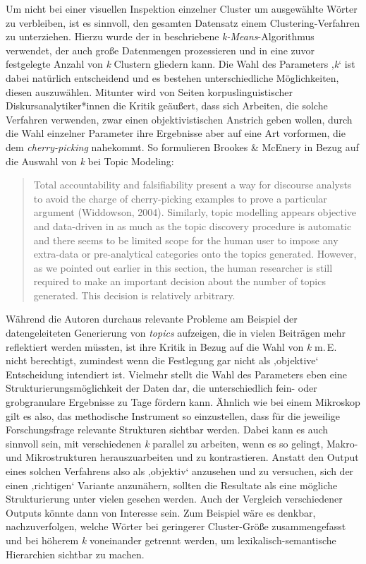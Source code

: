 Um nicht bei einer visuellen Inspektion einzelner Cluster um ausgewählte Wörter zu verbleiben, ist es sinnvoll, den gesamten Datensatz einem Clustering-Verfahren zu unterziehen. Hierzu wurde der in  beschriebene \emph{k-Means}-Algorithmus verwendet, der auch große Datenmengen prozessieren und in eine zuvor festgelegte Anzahl von \emph{k} Clustern gliedern kann. Die Wahl des Parameters ‚\emph{k}` ist dabei natürlich entscheidend und es bestehen unterschiedliche Möglichkeiten, diesen auszuwählen. Mitunter wird von Seiten korpuslinguistischer Diskursanalytiker*innen die Kritik geäußert, dass sich Arbeiten, die solche Verfahren verwenden, zwar einen objektivistischen Anstrich geben wollen, durch die Wahl einzelner Parameter ihre Ergebnisse aber auf eine Art vorformen, die dem \emph{cherry-picking} nahekommt. So formulieren Brookes \& McEnery in Bezug auf die Auswahl von \emph{k} bei Topic Modeling:

\begin{quote}
Total accountability and falsifiability present a way for discourse analysts to avoid the charge of cherry-picking examples to prove a particular argument (Widdowson, 2004). Similarly, topic modelling appears objective and data-driven in as much as the topic discovery procedure is automatic and there seems to be limited scope for the human user to impose any extra-data or pre-analytical categories onto the topics generated. However, as we pointed out earlier in this section, the human researcher is still required to make an important decision about the number of topics generated. This decision is relatively arbitrary. \autocite[7]{brookesUtilityTopicModelling2019}
\end{quote}

Während die Autoren durchaus relevante Probleme am Beispiel der datengeleiteten Generierung von \emph{topics} aufzeigen, die in vielen Beiträgen mehr reflektiert werden müssten, ist ihre Kritik in Bezug auf die Wahl von \emph{k} m.\,E. nicht berechtigt, zumindest wenn die Festlegung gar nicht als ‚objektive` Entscheidung intendiert ist. Vielmehr stellt die Wahl des Parameters eben eine Strukturierungsmöglichkeit der Daten dar, die unterschiedlich fein- oder grobgranulare Ergebnisse zu Tage fördern kann. Ähnlich wie bei einem Mikroskop gilt es also, das methodische Instrument so einzustellen, dass für die jeweilige Forschungsfrage relevante Strukturen sichtbar werden. Dabei kann es auch sinnvoll sein, mit verschiedenen \emph{k} parallel zu arbeiten, wenn es so gelingt, Makro- und Mikrostrukturen herauszuarbeiten und zu kontrastieren. Anstatt den Output eines solchen Verfahrens also als ‚objektiv` anzusehen und zu versuchen, sich der einen ‚richtigen` Variante anzunähern, sollten die Resultate als eine mögliche Strukturierung unter vielen gesehen werden. Auch der Vergleich verschiedener Outputs könnte dann von Interesse sein. Zum Beispiel wäre es denkbar, nachzuverfolgen, welche Wörter bei geringerer Cluster-Größe zusammengefasst und bei höherem \emph{k} voneinander getrennt werden, um lexikalisch-semantische Hierarchien sichtbar zu machen.

